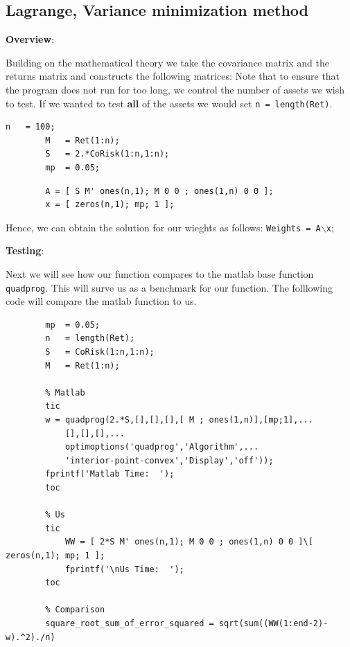 \documentclass[12pt,titlepage,a4paper]{article}
\begin{document}
	\subsection*{Lagrange, Variance minimization method}

	\begin{par}
		\textbf{Overview}:
	\end{par} \vspace{1em}
	\begin{par}
		Building on the mathematical theory we take the covariance matrix and the returns matrix and constructs the following matrices: Note that to ensure that the program does not run for too long, we control the number of assets we wish to test. If we wanted to test \textbf{all} of the assets we would set \texttt{n = length(Ret)}.
	\end{par} \vspace{1em}
	\begin{verbatim}n   = 100;
		M   = Ret(1:n);
		S   = 2.*CoRisk(1:n,1:n);
		mp  = 0.05;
	\end{verbatim}
	\begin{verbatim}
		A = [ S M' ones(n,1); M 0 0 ; ones(1,n) 0 0 ];
		x = [ zeros(n,1); mp; 1 ];
	\end{verbatim}
	\begin{par}
		Hence, we can obtain the solution for our wieghts as follows: \texttt{Weights = A\ensuremath{\backslash}x};
	\end{par} \vspace{1em}
	\begin{par}
		\textbf{Testing}:
	\end{par} \vspace{1em}
	\begin{par}
		Next we will see how our function compares to the matlab base function \texttt{quadprog}. This will surve us as a benchmark for our function. The folllowing code will compare the matlab function to us.
	\end{par} \vspace{1em}
	\begin{verbatim}
		mp  = 0.05;
		n   = length(Ret);
		S   = CoRisk(1:n,1:n);
		M   = Ret(1:n);

		% Matlab
		tic
	    w = quadprog(2.*S,[],[],[],[ M ; ones(1,n)],[mp;1],...
            [],[],[],...
            optimoptions('quadprog','Algorithm',...
            'interior-point-convex','Display','off'));
	    fprintf('Matlab Time:  ');
		toc

		% Us
		tic
		    WW = [ 2*S M' ones(n,1); M 0 0 ; ones(1,n) 0 0 ]\[ zeros(n,1); mp; 1 ];
		    fprintf('\nUs Time:  ');
		toc

		% Comparison
		square_root_sum_of_error_squared = sqrt(sum((WW(1:end-2)-w).^2)./n)
	\end{verbatim}
\end{document}
